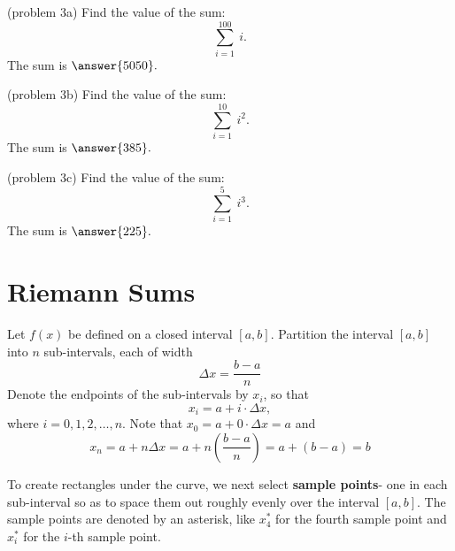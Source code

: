 \documentclass[handout]{ximera}
\begin{document}
\begin{problem}(problem 3a)
Find the value of the sum:
\[\sum_{i = 1}^{100} \ i.\]
The sum is $\answer{5050}.$
\end{problem}

\begin{problem}(problem 3b)
Find the value of the sum:
\[\sum_{i = 1}^{10} \ i^2.\]
The sum is $\answer{385}.$
\end{problem}

\begin{problem}(problem 3c)
Find the value of the sum:
\[\sum_{i = 1}^5 \ i^3.\]
The sum is $\answer{225}.$
\end{problem}

\section{Riemann Sums}


Let $f(x)$ be defined on a closed interval $[a,b]$. Partition the interval 
$[a,b]$ into $n$ sub-intervals, each of width
\[\Delta x = \frac{b-a}{n}\]
 Denote the endpoints of the sub-intervals by $x_i$, 
so that 
\[x_i =  a + i\cdot \Delta x,\]
 where $i = 0, 1, 2, \ldots, n$. Note that $x_0 = a + 0\cdot \Delta x = a$ and 
\[
x_n = a + n\Delta x = a + n \left( \frac{b-a}{n} \right) = a + (b-a) = b  
\]
\begin{image}
\end{image}


To create rectangles under the curve, we next select \textbf{sample points}- one in each sub-interval
so as to space them out roughly evenly over the interval $[a,b]$. The sample points are denoted by an asterisk,
like $x_4^*$ for the fourth sample point and $x_i^*$ for the $i$-th sample point.
\end{document}
